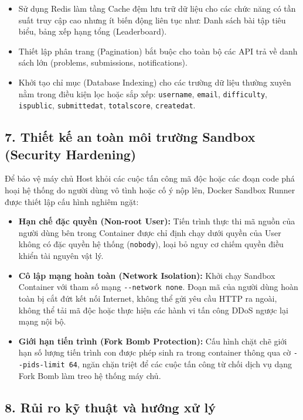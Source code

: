 \documentclass[12pt,a4paper]{article}
\renewcommand{\_}{\BreakableUnderscore}
\providecommand{\tightlist}{%
  \setlength{\itemsep}{0pt}\setlength{\parskip}{0pt}}
\begin{document}
\begin{itemize}
\tightlist
\item
  Sử dụng Redis làm tầng Cache đệm lưu trữ dữ liệu cho các chức năng có tần suất truy cập cao nhưng ít biến động liên tục như: Danh sách bài tập tiêu biểu, bảng xếp hạng tổng (Leaderboard).
\item
  Thiết lập phân trang (Pagination) bắt buộc cho toàn bộ các API trả về danh sách lớn (problems, submissions, notifications).
\item
  Khởi tạo chỉ mục (Database Indexing) cho các trường dữ liệu thường xuyên nằm trong điều kiện lọc hoặc sắp xếp: \texttt{username}, \texttt{email}, \texttt{difficulty}, \texttt{is\_public}, \texttt{submitted\_at}, \texttt{total\_score}, \texttt{created\_at}.
\end{itemize}

\subsection{7. Thiết kế an toàn môi trường Sandbox (Security Hardening)}

Để bảo vệ máy chủ Host khỏi các cuộc tấn công mã độc hoặc các đoạn code phá hoại hệ thống do người dùng vô tình hoặc cố ý nộp lên, Docker Sandbox Runner được thiết lập cấu hình nghiêm ngặt:

\begin{itemize}
\tightlist
\item
  \textbf{Hạn chế đặc quyền (Non-root User):} Tiến trình thực thi mã nguồn của người dùng bên trong Container được chỉ định chạy dưới quyền của User không có đặc quyền hệ thống (\texttt{nobody}), loại bỏ nguy cơ chiếm quyền điều khiển tài nguyên vật lý.
\item
  \textbf{Cô lập mạng hoàn toàn (Network Isolation):} Khởi chạy Sandbox Container với tham số mạng \texttt{-\/-network\ none}. Đoạn mã của người dùng hoàn toàn bị cắt đứt kết nối Internet, không thể gửi yêu cầu HTTP ra ngoài, không thể tải mã độc hoặc thực hiện các hành vi tấn công DDoS ngược lại mạng nội bộ.
\item
  \textbf{Giới hạn tiến trình (Fork Bomb Protection):} Cấu hình chặt chẽ giới hạn số lượng tiến trình con được phép sinh ra trong container thông qua cờ \texttt{-\/-pids-limit\ 64}, ngăn chặn triệt để các cuộc tấn công từ chối dịch vụ dạng Fork Bomb làm treo hệ thống máy chủ.
\end{itemize}

\subsection{8. Rủi ro kỹ thuật và hướng xử lý}
\end{document}
